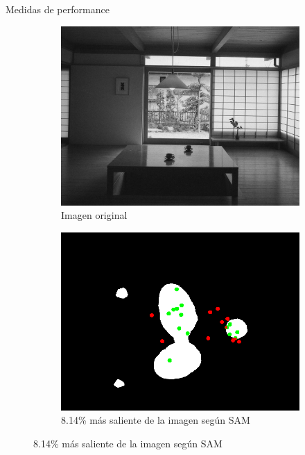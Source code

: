 \documentclass[compress]{beamer}
\begin{document}
\begin{frame}{Medidas de performance}
\begin{figure}[b]
    \centering
    \begin{subfigure}[t]{0.3\textwidth}
        \centering
        \includegraphics[width=\linewidth]{images/grayscale_100_oliva.jpg}
        \caption{\footnotesize Imagen original} \label{fig:grayscale_100_oliva}
    \end{subfigure}
    \hfill
    \begin{subfigure}[t]{0.3\textwidth}
        \centering
        \includegraphics[width=\linewidth]{images/example-salient-percent-8-14.png} 
        \caption{\footnotesize 8.14\% más saliente de la imagen según SAM} \label{fig:example-salient-percent-8-14}
    \end{subfigure}

\end{figure}
\end{frame}
\end{document}
